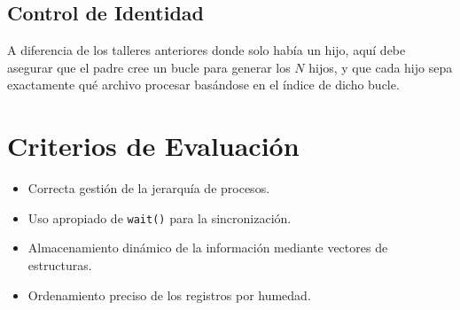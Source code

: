 \documentclass[12pt,a4paper]{article}
\begin{document}
\subsection*{Control de Identidad}
A diferencia de los talleres anteriores donde solo había un hijo, aquí debe asegurar que el padre cree un bucle para generar los $N$ hijos, y que cada hijo sepa exactamente qué archivo procesar basándose en el índice de dicho bucle.

\section*{Criterios de Evaluación}
\begin{itemize}
    \item Correcta gestión de la jerarquía de procesos.
    \item Uso apropiado de \texttt{wait()} para la sincronización.
    \item Almacenamiento dinámico de la información mediante vectores de estructuras.
    \item Ordenamiento preciso de los registros por humedad.
\end{itemize}
\end{document}
